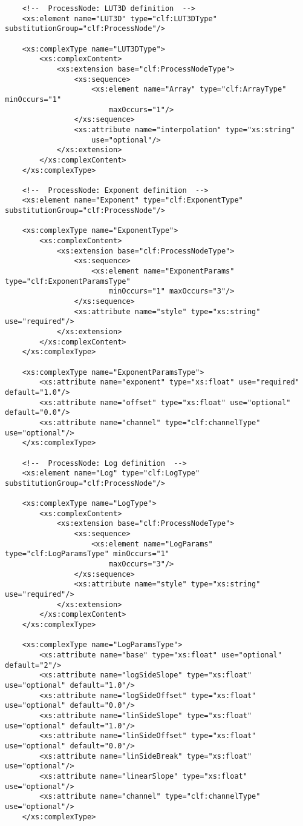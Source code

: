 \begin{lstlisting}
    <!--  ProcessNode: LUT3D definition  -->
    <xs:element name="LUT3D" type="clf:LUT3DType" substitutionGroup="clf:ProcessNode"/>
    
    <xs:complexType name="LUT3DType">
        <xs:complexContent>
            <xs:extension base="clf:ProcessNodeType">
                <xs:sequence>
                    <xs:element name="Array" type="clf:ArrayType" minOccurs="1" 
                        maxOccurs="1"/>
                </xs:sequence>
                <xs:attribute name="interpolation" type="xs:string" 
                    use="optional"/>
            </xs:extension>
        </xs:complexContent>
    </xs:complexType>
    
    <!--  ProcessNode: Exponent definition  -->
    <xs:element name="Exponent" type="clf:ExponentType" substitutionGroup="clf:ProcessNode"/>
    
    <xs:complexType name="ExponentType">
        <xs:complexContent>
            <xs:extension base="clf:ProcessNodeType">
                <xs:sequence>
                    <xs:element name="ExponentParams" type="clf:ExponentParamsType" 
                        minOccurs="1" maxOccurs="3"/>
                </xs:sequence>
                <xs:attribute name="style" type="xs:string" use="required"/>
            </xs:extension>
        </xs:complexContent>
    </xs:complexType>
    
    <xs:complexType name="ExponentParamsType">
        <xs:attribute name="exponent" type="xs:float" use="required" default="1.0"/>
        <xs:attribute name="offset" type="xs:float" use="optional" default="0.0"/>
        <xs:attribute name="channel" type="clf:channelType" use="optional"/>
    </xs:complexType>

    <!--  ProcessNode: Log definition  -->
    <xs:element name="Log" type="clf:LogType" substitutionGroup="clf:ProcessNode"/>
    
    <xs:complexType name="LogType">
        <xs:complexContent>
            <xs:extension base="clf:ProcessNodeType">
                <xs:sequence>
                    <xs:element name="LogParams" type="clf:LogParamsType" minOccurs="1" 
                        maxOccurs="3"/>
                </xs:sequence>                
                <xs:attribute name="style" type="xs:string" use="required"/>
            </xs:extension>
        </xs:complexContent>        
    </xs:complexType>

    <xs:complexType name="LogParamsType">
        <xs:attribute name="base" type="xs:float" use="optional" default="2"/>
        <xs:attribute name="logSideSlope" type="xs:float" use="optional" default="1.0"/>
        <xs:attribute name="logSideOffset" type="xs:float" use="optional" default="0.0"/>
        <xs:attribute name="linSideSlope" type="xs:float" use="optional" default="1.0"/>
        <xs:attribute name="linSideOffset" type="xs:float" use="optional" default="0.0"/>
        <xs:attribute name="linSideBreak" type="xs:float" use="optional"/>
        <xs:attribute name="linearSlope" type="xs:float" use="optional"/>
        <xs:attribute name="channel" type="clf:channelType" use="optional"/>
    </xs:complexType>
    

\end{lstlisting}
